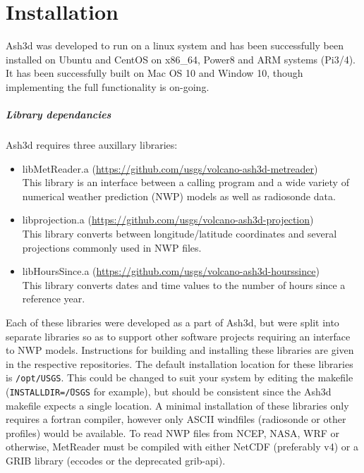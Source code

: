 \chapter{Installation}\label{ChapInstall}
Ash3d was developed to run on a linux system and has been successfully been installed
on Ubuntu and CentOS on x86\_64, Power8 and ARM systems (Pi3/4).
It has been successfully built on Mac OS 10 and Window 10, though implementing the
full functionality is on-going.

\paragraph{Library dependancies}
Ash3d requires three auxillary libraries:
\begin{itemize}
\item libMetReader.a  (\url{https://github.com/usgs/volcano-ash3d-metreader}) \\
This library is an interface between a calling program and a wide variety of
numerical weather prediction (NWP) models as well as radiosonde data.

\item libprojection.a (\url{https://github.com/usgs/volcano-ash3d-projection}) \\
This library converts between longitude/latitude coordinates and several projections
commonly used in NWP files.

\item libHoursSince.a (\url{https://github.com/usgs/volcano-ash3d-hourssince}) \\
This library converts dates and time values to the number of hours since a
reference year.
\end{itemize}

Each of these libraries were developed as a part of Ash3d, but were split into
separate libraries so as to support other software projects requiring an
interface to NWP models.  Instructions for building and installing these
libraries are given in the respective repositories.  The default installation
location for these libraries is \texttt{/opt/USGS}.  This could be changed to suit
your system by editing the makefile (\texttt{INSTALLDIR=\~/USGS} for example),
but should be consistent since the Ash3d makefile expects
a single location.  A minimal installation of these libraries only requires
a fortran compiler, however only ASCII windfiles (radiosonde or other profiles)
would be available.  To read NWP files from NCEP, NASA, WRF or otherwise, 
MetReader must be compiled with either NetCDF (preferably v4) or a GRIB
library (eccodes or the deprecated grib-api).

